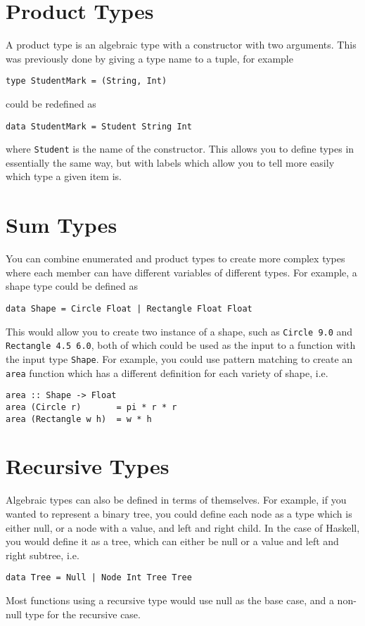 \section*{Product Types}

A product type is an algebraic type with a constructor with two arguments. This was previously done by giving a type
 name to a tuple, for example
\begin{verbatim}
type StudentMark = (String, Int)
\end{verbatim}
could be redefined as
\begin{verbatim}
data StudentMark = Student String Int
\end{verbatim}
where \verb`Student` is the name of the constructor. This allows you to define types in essentially the same way, but
 with labels which allow you to tell more easily which type a given item is.

\section*{Sum Types}

You can combine enumerated and product types to create more complex types where each member can have different variables
 of different types. For example, a shape type could be defined as
\begin{verbatim}
data Shape = Circle Float | Rectangle Float Float
\end{verbatim}
This would allow you to create two instance of a shape, such as \verb`Circle 9.0` and \verb`Rectangle 4.5 6.0`, both of
 which could be used as the input to a function with the input type \verb`Shape`. For example, you could use pattern
 matching to create an \verb`area` function which has a different definition for each variety of shape, i.e.
\begin{verbatim}
area :: Shape -> Float
area (Circle r)       = pi * r * r
area (Rectangle w h)  = w * h
\end{verbatim}

\section*{Recursive Types}

Algebraic types can also be defined in terms of themselves. For example, if you wanted to represent a binary tree, you
 could define each node as a type which is either null, or a node with a value, and left and right child. In the case of
 Haskell, you would define it as a tree, which can either be null or a value and left and right subtree, i.e.
\begin{verbatim}
data Tree = Null | Node Int Tree Tree
\end{verbatim}

Most functions using a recursive type would use null as the base case, and a non-null type for the recursive case.
